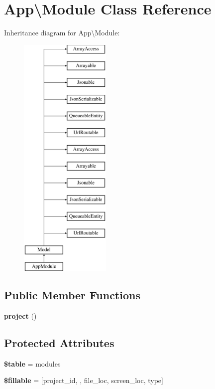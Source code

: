\section{App\textbackslash{}Module Class Reference}
\label{class_app_1_1_module}
Inheritance diagram for App\textbackslash{}Module\+:\begin{figure}[H]
\begin{center}
\leavevmode
\includegraphics[height=12.000000cm]{class_app_1_1_module}
\end{center}
\end{figure}
\subsection*{Public Member Functions}
\begin{DoxyCompactItemize}
\item 
{\bf project} ()
\end{DoxyCompactItemize}
\subsection*{Protected Attributes}
\begin{DoxyCompactItemize}
\item 
{\bf \$table} = \textquotesingle{}modules\textquotesingle{}
\item 
{\bf \$fillable} = [\textquotesingle{}project\+\_\+id\textquotesingle{}, \textquotesingle{}, \textquotesingle{}file\+\_\+loc\textquotesingle{}, \textquotesingle{}screen\+\_\+loc\textquotesingle{}, \textquotesingle{}type\textquotesingle{}]
\end{DoxyCompactItemize}
